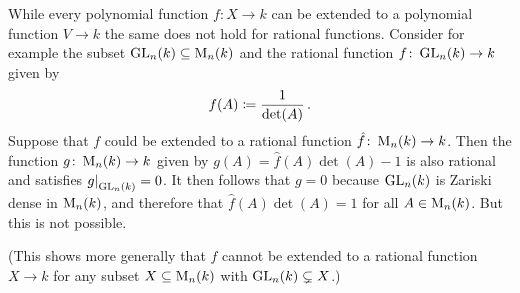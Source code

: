 \begin{warning}
  While every polynomial function $f \colon X \to k$ can be extended to a polynomial function $V \to k$ the same does not hold for rational functions.
  Consider for example the subset $\operatorname{GL}_n(k) \subseteq \operatorname{M}_n(k)$ and the rational function $f \colon \operatorname{GL}_n(k) \to k$ given by
  \[
              f(A)
    \coloneqq  \frac{1}{\det(A)} \,.
  \]
  Suppose that $f$ could be extended to a rational function $\hat{f} \colon \operatorname{M}_n(k) \to k$.
  Then the function $g \colon \operatorname{M}_n(k) \to k$ given by $g(A) = \hat{f}(A) \det(A) - 1$ is also rational and satisfies $\restrict{g}{\GL_n(k)} = 0$.
  It then follows that $g = 0$ because $\operatorname{GL}_n(k)$ is Zariski dense in $\operatorname{M}_n(k)$, and therefore that $\hat{f}(A) \det(A) = 1$ for all $A \in \operatorname{M}_n(k)$.
  But this is not possible.
  
  (This shows more generally that $f$ cannot be extended to a rational function $X \to k$ for any subset $X \subseteq \operatorname{M}_n(k)$ with $\operatorname{GL}_n(k) \subsetneq X$.)
\end{warning}


